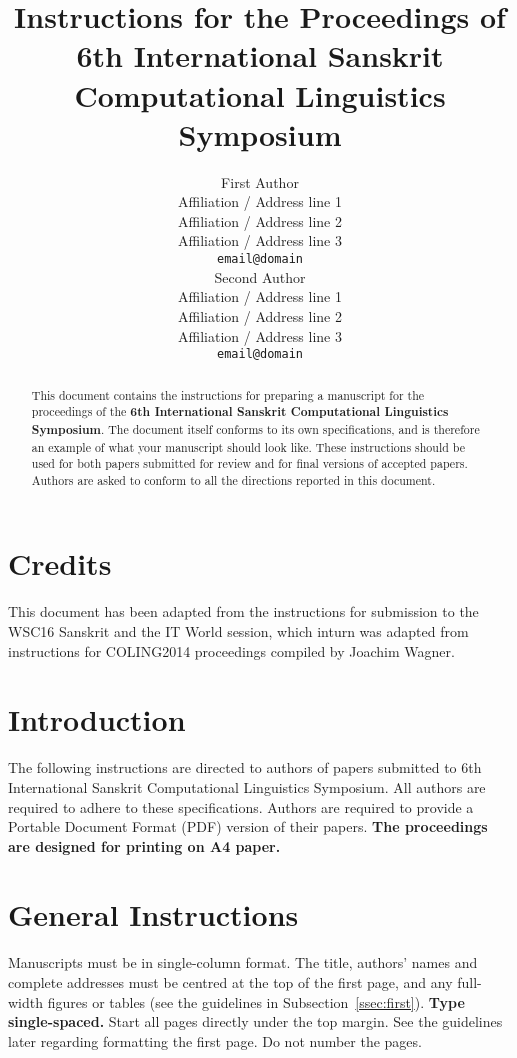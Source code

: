\documentclass[11pt]{article}
\title{Instructions for the Proceedings of \\6th International Sanskrit Computational Linguistics Symposium}
\author{First Author \\
	Affiliation / Address line 1 \\
	Affiliation / Address line 2 \\
	Affiliation / Address line 3 \\
	{\tt email@domain} \\\And
	Second Author \\
	Affiliation / Address line 1 \\
	Affiliation / Address line 2 \\
	Affiliation / Address line 3 \\
	{\tt email@domain} \\}
\date{}
\begin{document}
	
	\maketitle
	
	\begin{abstract}
		This document contains the instructions for preparing a
		manuscript for the proceedings of the \textbf{6th International Sanskrit Computational Linguistics Symposium}. 
		The document itself
		conforms to its own specifications, and is therefore an example of
		what your manuscript should look like. These instructions should be
		used for both papers submitted for review and for final versions of
		accepted papers.  Authors are asked to conform to all the directions
		reported in this document.
	\end{abstract}
	
	\section{Credits}
	
	This document has been adapted from the instructions for submission to the WSC16 Sanskrit
	and the IT World session, which inturn was adapted from instructions for  COLING2014
	proceedings compiled by Joachim Wagner. 
	
	\section{Introduction}
	\label{intro}
	
	\blfootnote{
	}
	
	The following instructions are directed to authors of papers submitted
	to 6th International Sanskrit Computational Linguistics Symposium.  All
	authors are required to adhere to these specifications. Authors are
	required to provide a Portable Document Format (PDF) version of their
	papers. \textbf{The proceedings are designed for printing on A4
		paper.}
	
	\section{General Instructions}
	
	Manuscripts must be in single-column format.
	The title, authors' names and complete
	addresses
	must be centred at the top of the first page, and
	any full-width figures or tables (see the guidelines in
	Subsection~\ref{ssec:first}). {\bf Type single-spaced.}  Start all
	pages directly under the top margin. See the guidelines later
	regarding formatting the first page.  
	Do not number the pages.
	
\end{document}
